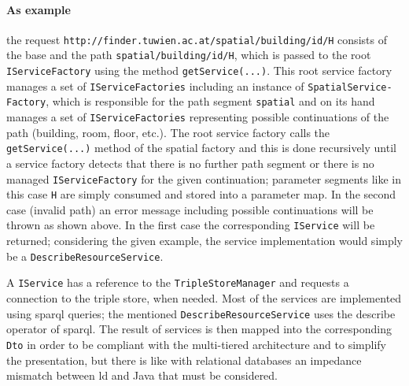 \documentclass[draft,final]{vutinfth} %
\begin{document}
\paragraph{As example} the request \texttt{http://finder.tuwien.ac.at/spatial/building/id/H} consists of the base and the path \texttt{spatial/building/id/H}, which is passed to the root \texttt{IServiceFactory} using the method \texttt{getService(...)}. This root service factory manages a set of \texttt{IServiceFactories} including an instance of \texttt{SpatialService-\\Factory}, which is responsible for the path segment \texttt{spatial} and on its hand manages a set of \texttt{IServiceFactories} representing possible continuations of the path (building, room, floor, etc.). The root service factory calls the \texttt{getService(...)} method of the spatial factory and this is done recursively until a service factory detects that there is no further path segment or there is no managed \texttt{IServiceFactory} for the given continuation; parameter segments like in this case \texttt{H} are simply consumed and stored into a parameter map. In the second case (invalid path) an error message including possible continuations will be thrown as shown above. In the first case the corresponding \texttt{IService} will be returned; considering the given example, the service implementation would simply be a \texttt{DescribeResourceService}.

A \texttt{IService} has a reference to the \texttt{TripleStoreManager} and requests a connection to the triple store, when needed. Most of the services are implemented using \gls{sparql} queries; the mentioned \texttt{DescribeResourceService} uses the describe operator of \gls{sparql}. The result of services is then mapped into the corresponding \texttt{Dto} in order to be compliant with the multi-tiered architecture and to simplify the presentation, but there is like with relational databases an impedance mismatch between \gls{ld} and Java that must be considered.
\end{document}
